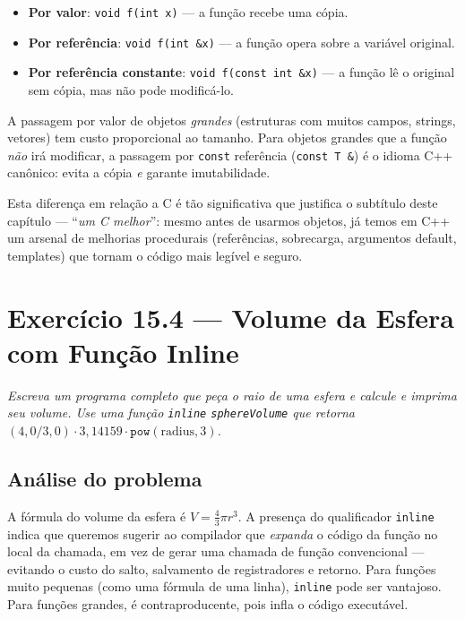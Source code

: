 \documentclass[11pt,a4paper]{article}
\begin{document}
\begin{itemize}[leftmargin=*,itemsep=0pt]
  \item \textbf{Por valor}: \texttt{void f(int x)} --- a fun\c{c}\~ao recebe uma c\'opia.
  \item \textbf{Por refer\^encia}: \texttt{void f(int \&x)} --- a fun\c{c}\~ao opera sobre a vari\'avel original.
  \item \textbf{Por refer\^encia constante}: \texttt{void f(const int \&x)} --- a fun\c{c}\~ao l\^e o original sem c\'opia, mas n\~ao pode modific\'a-lo.
\end{itemize}

\begin{dicadesemp}
A passagem por valor de objetos \emph{grandes} (estruturas com muitos campos, strings, vetores) tem custo proporcional ao tamanho. Para objetos grandes que a fun\c{c}\~ao \emph{n\~ao} ir\'a modificar, a passagem por \texttt{const} refer\^encia (\texttt{const T \&}) \'e o idioma C++ canônico: evita a c\'opia \emph{e} garante imutabilidade.
\end{dicadesemp}

\begin{obseng}
Esta diferen\c{c}a em rela\c{c}\~ao a C \'e t\~ao significativa que justifica o subt\'itulo deste cap\'itulo --- ``\emph{um C melhor}'': mesmo antes de usarmos objetos, j\'a temos em C++ um arsenal de melhorias procedurais (refer\^encias, sobrecarga, argumentos default, templates) que tornam o c\'odigo mais leg\'ivel e seguro.
\end{obseng}

\section{Exerc\'icio 15.4 --- Volume da Esfera com Fun\c{c}\~ao Inline}

\textit{Escreva um programa completo que pe\c{c}a o raio de uma esfera e calcule e imprima seu volume. Use uma fun\c{c}\~ao \texttt{inline} \texttt{sphereVolume} que retorna $(4{,}0/3{,}0) \cdot 3{,}14159 \cdot \texttt{pow}(\text{radius}, 3)$.}

\subsection*{An\'alise do problema}

A f\'ormula do volume da esfera \'e $V = \tfrac{4}{3}\pi r^{3}$. A presen\c{c}a do qualificador \texttt{inline} indica que queremos sugerir ao compilador que \emph{expanda} o c\'odigo da fun\c{c}\~ao no local da chamada, em vez de gerar uma chamada de fun\c{c}\~ao convencional --- evitando o custo do salto, salvamento de registradores e retorno. Para fun\c{c}\~oes muito pequenas (como uma f\'ormula de uma linha), \texttt{inline} pode ser vantajoso. Para fun\c{c}\~oes grandes, \'e contraproducente, pois infla o c\'odigo execut\'avel.
\end{document}
